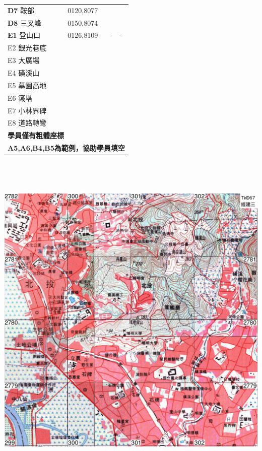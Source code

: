 \documentclass{article}
\begin{document}
\begin{CJK*}{UTF8}{bkai}
\begin{multicols}{2}
\begin{tabular}{|l|c|c|l|}
	\textbf{D7} 鞍部&0120,8077& &\\
	\textbf{D8} 三叉峰&0150,8074& &\\
	\hline
	\textbf{E1} 登山口&0126,8109&-&-\\
	E2 銀光巷底& & &\\
	E3 大廣場& & &\\
	E4 磺溪山& & &\\
	E5 墓園高地& & &\\
	E6 鐵塔& & &\\
	E7 小林界碑& & &\\
	E8 道路轉彎& & &\\
	\hline
	\multicolumn{4}{l}{\textbf{學員僅有粗體座標}}\\
	\multicolumn{4}{l}{\textbf{A5,A6,B4,B5為範例，協助學員填空}}
\end{tabular}


\cleardoublepage

\includegraphics[width=20.73cm, height=16.58cm]{v3.png}


\end{multicols}
\end{CJK*}
\end{document}
